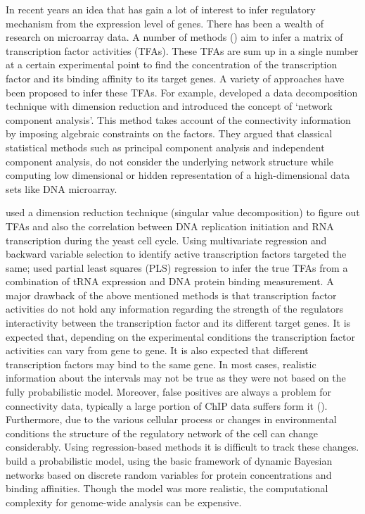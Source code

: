 In recent years an idea that has gain a lot of interest to infer regulatory mechanism from the expression level of genes. There has been a wealth of research on microarray data. A number of methods (\cite{Alter:2004, Gao:2004, Liao:2003}) aim to infer a matrix of transcription factor activities (TFAs). These TFAs are sum up in a single number at a certain experimental point to find the concentration of the transcription factor and its binding affinity to its target genes. A variety of approaches have been proposed to infer these TFAs. For example, \cite{Liao:2003} developed a data decomposition technique with dimension reduction and introduced the concept of ‘network component analysis’. This method takes account of the connectivity information by imposing algebraic constraints on the factors. They argued that classical statistical methods such as principal component analysis and independent component analysis, do not consider the underlying network structure while computing low dimensional or hidden representation of a high-dimensional data sets like DNA microarray. 

\cite{Alter:2004} used a dimension reduction technique (singular value decomposition) to figure out TFAs and also the correlation between DNA replication initiation and RNA transcription during the yeast cell cycle. Using multivariate regression and backward variable selection to identify active transcription factors \cite{Gao:2004} targeted the same; \cite{Boulesteix:2005} used partial least squares (PLS) regression to infer the true TFAs from a combination of tRNA expression and DNA protein binding measurement. A major drawback of the above mentioned methods is that transcription factor activities do not hold any information regarding the strength of the regulators interactivity between the transcription factor and its different target genes. It is expected that, depending on the experimental conditions the transcription factor activities can vary from gene to gene. It is also expected that different transcription factors may bind  to the same gene. In most cases, realistic information about the intervals may not be true as they were not based on the fully probabilistic model. Moreover, false positives are always a problem for connectivity data, typically a large portion of ChIP data suffers form it (\cite{Boulesteix:2005}). Furthermore, due to the various cellular process or changes in environmental conditions the structure of the regulatory network of the cell can change considerably. Using regression-based methods it is difficult to track these changes. \cite{Nachman:2004} build a probabilistic model, using the basic framework of dynamic Bayesian networks based on discrete random variables for protein concentrations and binding affinities. Though the model was more realistic, the computational complexity for genome-wide analysis can be expensive.

